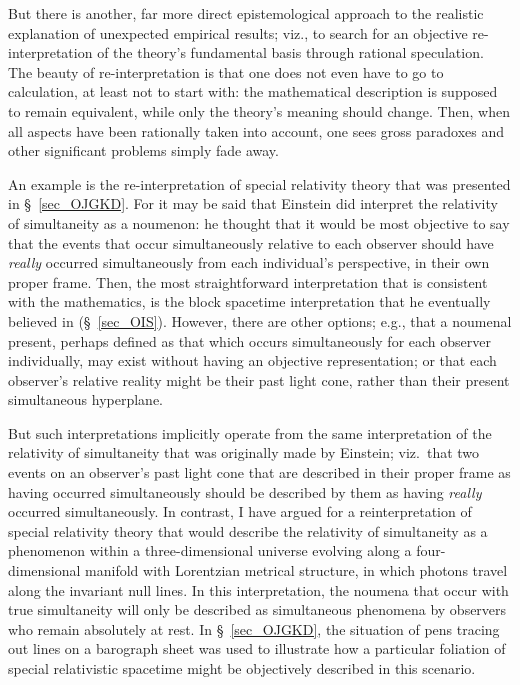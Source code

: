 But there is another, far more direct epistemological approach to the realistic explanation of unexpected empirical results; viz., to search for an objective re-interpretation of the theory's fundamental basis through rational speculation. The beauty of re-interpretation is that one does not even have to go to calculation, at least not to start with: the mathematical description is supposed to remain equivalent, while only the theory's meaning should change. Then, when all aspects have been rationally taken into account, one sees gross paradoxes and other significant problems simply fade away.

An example is the re-interpretation of special relativity theory that was presented in \S~\ref{sec_OJGKD}. For it may be said that Einstein did interpret the relativity of simultaneity as a noumenon: he thought that it would be most objective to say that the events that occur simultaneously relative to each observer should have \textit{really} occurred simultaneously from each individual's perspective, in their own proper frame. Then, the most straightforward interpretation that is consistent with the mathematics, is the block spacetime interpretation that he eventually believed in (\S~\ref{sec_OIS}). However, there are other options; e.g., that a noumenal present, perhaps defined as that which occurs simultaneously for each observer individually, may exist without having an objective representation; or that each observer's relative reality might be their past light cone, rather than their present simultaneous hyperplane. 

But such interpretations implicitly operate from the same interpretation of the relativity of simultaneity that was originally made by Einstein; viz.~that two events on an observer's past light cone that are described in their proper frame as having occurred simultaneously should be described by them as having \textit{really} occurred simultaneously. In contrast, I have argued for a reinterpretation of special relativity theory that would describe the relativity of simultaneity as a phenomenon within a three-dimensional universe evolving along a four-dimensional manifold with Lorentzian metrical structure, in which photons travel along the invariant null lines. In this interpretation, the noumena that occur with true simultaneity will only be described as simultaneous phenomena by observers who remain absolutely at rest. In \S~\ref{sec_OJGKD}, the situation of pens tracing out lines on a barograph sheet was used to illustrate how a particular foliation of special relativistic spacetime might be objectively described in this scenario.

